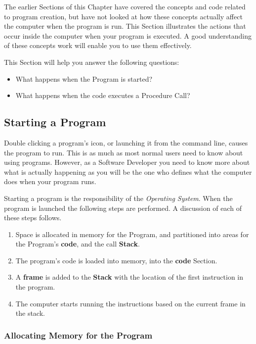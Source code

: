 The earlier Sections of this Chapter have covered the concepts and code related to program creation, but have not looked at how these concepts actually affect the computer when the program is run. This Section illustrates the actions that occur inside the computer when your program is executed. A good understanding of these concepts work will enable you to use them effectively.

This Section will help you answer the following questions:
\begin{itemize}
  \item What happens when the Program is started?
  \item What happens when the code executes a Procedure Call?
\end{itemize}

\subsection{Starting a Program} %
\label{sub:starting_a_program}

Double clicking a program's icon, or launching it from the command line, causes the program to run. This is as much as most normal users need to know about using programs. However, as a Software Developer you need to know more about what is actually happening as you will be the one who defines what the computer does when your program runs.

\bigskip

Starting a program is the responsibility of the \emph{Operating System}. When the program is launched the following steps are performed. A discussion of each of these steps follows.

\begin{enumerate}
  \item Space is allocated in memory for the Program, and partitioned into areas for the Program's \textbf{code}, and the call \textbf{Stack}.
  \item The program's code is loaded into memory, into the \textbf{code} Section.
  \item A \textbf{frame} is added to the \textbf{Stack} with the location of the first instruction in the program.
  \item The computer starts running the instructions based on the current frame in the stack.
\end{enumerate}

\clearpage
\subsubsection{Allocating Memory for the Program} %
\label{ssub:allocating_memory_for_the_program}

